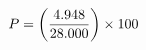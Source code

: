 \documentclass[preview]{standalone}
\begin{document}
\begin{align*}
\special{dvisvgm:raw <g id='unique000'>}P = \left( \frac{4.948}{28.000} \right) \times 100\\\special{dvisvgm:raw </g>}
\end{align*}
\end{document}
